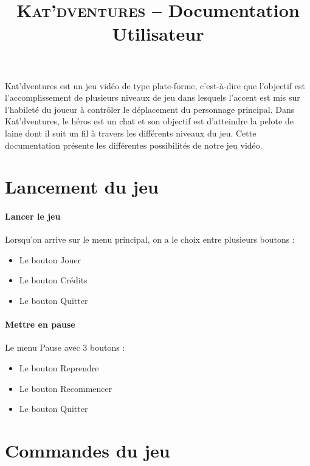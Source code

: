 \documentclass[a4paper,11pt]{article}
\title{ \textsc{Kat'dventures} -- Documentation Utilisateur}
\date{}                    %
\begin{document}
          

\maketitle                 %
\thispagestyle{empty}      %


Kat’dventures est un jeu vidéo de type plate-forme, c’est-à-dire que l’objectif est l’accomplissement de plusieurs niveaux de jeu dans lesquels l'accent est mis sur l'habileté du joueur à contrôler le déplacement du personnage principal. Dans Kat’dventures, le héros est un chat et son objectif est d’atteindre la pelote de laine dont il suit un fil à travers les différents niveaux du jeu.
Cette documentation présente les différentes possibilités de notre jeu vidéo.

\section{Lancement du jeu}
\paragraph{Lancer le jeu}   Lorsqu'on arrive sur le menu principal, on a le choix entre plusieurs boutons :

\begin{itemize}
\item Le bouton Jouer
\item Le bouton Crédits
\item Le bouton Quitter
\end{itemize} 

\paragraph{Mettre en pause}  Le menu Pause  avec 3 boutons :

\begin{itemize}
\item Le bouton Reprendre
\item Le bouton Recommencer
\item Le bouton Quitter
\end{itemize} 


\section{Commandes du jeu}
\end{document}
